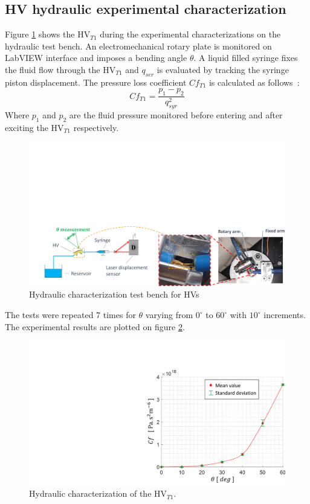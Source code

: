 \documentclass[3p,twocolumn,preprint]{elsarticle}
\begin{document}
	\subsection{HV hydraulic experimental characterization}	
	\label{subsec:HV hydraulic test bench presentation}
Figure \ref{fig:essais_hydraulique_VH} shows the HV$_{T1}$ during the experimental characterizations on the hydraulic test bench. An electromechanical rotary plate is monitored on LabVIEW interface and imposes a bending angle $\theta$. A liquid filled syringe fixes the fluid flow through the HV$_{T1}$ and $q_{ser}$ is evaluated by tracking the syringe piston displacement. The pressure loss coefficient $Cf_{T1}$ is calculated as \mbox{follows :}
\begin{equation}
	Cf_{T1} = \dfrac{p_1-p_2}{q_{syr}^2}
\end{equation}
Where $p_1$ and $p_2$ are the fluid pressure monitored before entering and after exciting the HV$_{T1}$ respectively.
\begin{figure}[!htb]
\begin{center}
	\captionsetup{justification=centering} 
	\includegraphics[trim={2cm 0cm 0cm 11cm},clip,width=.8\textwidth]{figures/essais_hydraulique_VH.pdf}
	\caption{Hydraulic characterization test bench for HVs}
	\label{fig:essais_hydraulique_VH}
\end{center}	
\end{figure}    
The tests were repeated 7 times for $\theta$ varying from $0^{\circ}$ to $60^{\circ}$ with $10^{\circ}$ increments. The experimental results are plotted on figure \ref{fig:resultats_essais_hydraulique_VH_D1mm}.
\begin{figure}[!htb]
\centering
	\captionsetup{justification=centering}
	\includegraphics[trim={15.5cm 0cm 0cm 3.6cm},clip,width=0.7\linewidth]{figures/resultats_essais_hydraulique_VH_D1mm.pdf}
	\caption{Hydraulic characterization of the HV$_{T1}$.}
	\label{fig:resultats_essais_hydraulique_VH_D1mm}
\end{figure}
\end{document}
